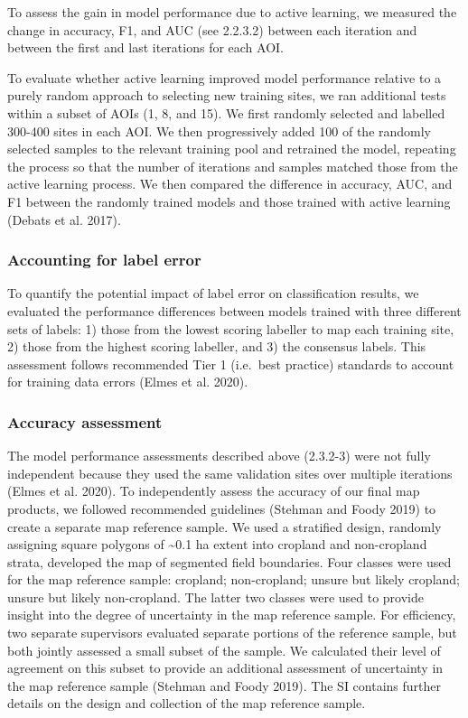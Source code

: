 \documentclass[11pt,a4paper]{article}
\begin{document}
To assess the gain in model performance due to active learning, we
measured the change in accuracy, F1, and AUC (see 2.2.3.2) between each
iteration and between the first and last iterations for each AOI.

To evaluate whether active learning improved model performance relative
to a purely random approach to selecting new training sites, we ran
additional tests within a subset of AOIs (1, 8, and 15). We first
randomly selected and labelled 300-400 sites in each AOI. We then
progressively added 100 of the randomly selected samples to the relevant
training pool and retrained the model, repeating the process so that the
number of iterations and samples matched those from the active learning
process. We then compared the difference in accuracy, AUC, and F1
between the randomly trained models and those trained with active
learning (Debats et al. 2017).

\hypertarget{accounting-for-label-error}{%
\subsubsection{Accounting for label
error}\label{accounting-for-label-error}}

To quantify the potential impact of label error on classification
results, we evaluated the performance differences between models trained
with three different sets of labels: 1) those from the lowest scoring
labeller to map each training site, 2) those from the highest scoring
labeller, and 3) the consensus labels. This assessment follows
recommended Tier 1 (i.e.~best practice) standards to account for
training data errors (Elmes et al. 2020).

\hypertarget{accuracy-assessment}{%
\subsubsection{Accuracy assessment}\label{accuracy-assessment}}

The model performance assessments described above (2.3.2-3) were not
fully independent because they used the same validation sites over
multiple iterations (Elmes et al. 2020). To independently assess the
accuracy of our final map products, we followed recommended guidelines
(Stehman and Foody 2019) to create a separate map reference sample. We
used a stratified design, randomly assigning square polygons of
\textasciitilde0.1 ha extent into cropland and non-cropland strata,
developed the map of segmented field boundaries. Four classes were used
for the map reference sample: cropland; non-cropland; unsure but likely
cropland; unsure but likely non-cropland. The latter two classes were
used to provide insight into the degree of uncertainty in the map
reference sample. For efficiency, two separate supervisors evaluated
separate portions of the reference sample, but both jointly assessed a
small subset of the sample. We calculated their level of agreement on
this subset to provide an additional assessment of uncertainty in the
map reference sample (Stehman and Foody 2019). The SI contains further
details on the design and collection of the map reference sample.
\end{document}
